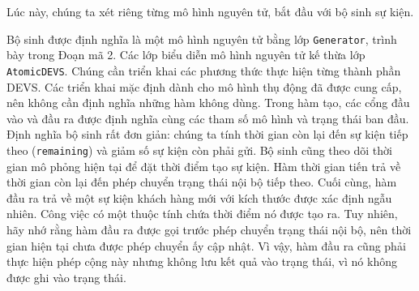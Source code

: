 Lúc này, chúng ta xét riêng từng mô hình nguyên tử, bắt đầu với bộ sinh sự kiện.

Bộ sinh được định nghĩa là một mô hình nguyên tử bằng lớp \texttt{Generator}, trình bày trong Đoạn mã 2. Các lớp biểu diễn mô hình nguyên tử kế thừa lớp \texttt{AtomicDEVS}. Chúng cần triển khai các phương thức thực hiện từng thành phần DEVS. Các triển khai mặc định dành cho mô hình thụ động đã được cung cấp, nên không cần định nghĩa những hàm không dùng. Trong hàm tạo, các cổng đầu vào và đầu ra được định nghĩa cùng các tham số mô hình và trạng thái ban đầu. Định nghĩa bộ sinh rất đơn giản: chúng ta tính thời gian còn lại đến sự kiện tiếp theo (\texttt{remaining}) và giảm số sự kiện còn phải gửi. Bộ sinh cũng theo dõi thời gian mô phỏng hiện tại để đặt thời điểm tạo sự kiện. Hàm thời gian tiến trả về thời gian còn lại đến phép chuyển trạng thái nội bộ tiếp theo. Cuối cùng, hàm đầu ra trả về một sự kiện khách hàng mới
với kích thước được xác định ngẫu nhiên. Công việc có một thuộc tính chứa thời điểm nó được tạo ra. Tuy nhiên, hãy nhớ rằng hàm đầu ra được gọi trước phép chuyển trạng thái nội bộ, nên thời gian hiện tại chưa được phép chuyển ấy cập nhật. Vì vậy, hàm đầu ra cũng phải thực hiện phép cộng này nhưng không lưu kết quả vào trạng thái, vì nó không được ghi vào trạng thái.

